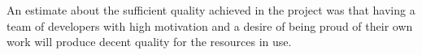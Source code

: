 
An estimate about the sufficient quality achieved in the project was that having a team of developers with high motivation and a desire of being proud of their own work will produce decent quality for the resources in use. 

